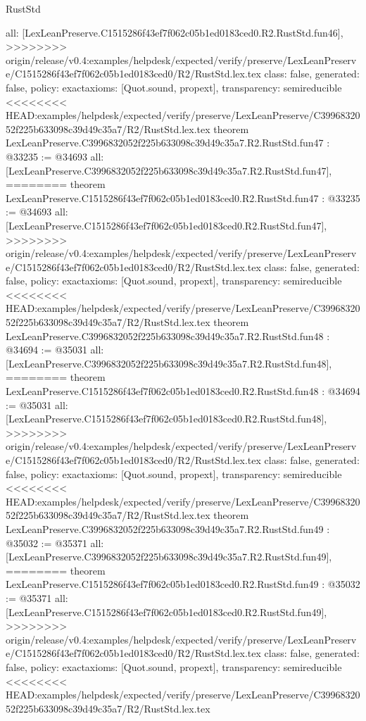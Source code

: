 \begin{lexlean}{RustStd}
\begin{coremodule}
{\begin{coremodule}
{{{{{{{{{{{{{{{{{{{{{{{{{{{{{{{{{{{{{{{{{{{{{{{{{{  all: [LexLeanPreserve.C1515286f43ef7f062c05b1ed0183ced0.R2.RustStd.fun46],
>>>>>>>> origin/release/v0.4:examples/helpdesk/expected/verify/preserve/LexLeanPreserve/C1515286f43ef7f062c05b1ed0183ced0/R2/RustStd.lex.tex
  class: false,
  generated: false,
  policy: exact{axioms: [Quot.sound, propext]},
  transparency: semireducible
}
<<<<<<<< HEAD:examples/helpdesk/expected/verify/preserve/LexLeanPreserve/C3996832052f225b633098c39d49c35a7/R2/RustStd.lex.tex
theorem LexLeanPreserve.C3996832052f225b633098c39d49c35a7.R2.RustStd.fun47 : @33235 := @34693 {
  all: [LexLeanPreserve.C3996832052f225b633098c39d49c35a7.R2.RustStd.fun47],
========
theorem LexLeanPreserve.C1515286f43ef7f062c05b1ed0183ced0.R2.RustStd.fun47 : @33235 := @34693 {
  all: [LexLeanPreserve.C1515286f43ef7f062c05b1ed0183ced0.R2.RustStd.fun47],
>>>>>>>> origin/release/v0.4:examples/helpdesk/expected/verify/preserve/LexLeanPreserve/C1515286f43ef7f062c05b1ed0183ced0/R2/RustStd.lex.tex
  class: false,
  generated: false,
  policy: exact{axioms: [Quot.sound, propext]},
  transparency: semireducible
}
<<<<<<<< HEAD:examples/helpdesk/expected/verify/preserve/LexLeanPreserve/C3996832052f225b633098c39d49c35a7/R2/RustStd.lex.tex
theorem LexLeanPreserve.C3996832052f225b633098c39d49c35a7.R2.RustStd.fun48 : @34694 := @35031 {
  all: [LexLeanPreserve.C3996832052f225b633098c39d49c35a7.R2.RustStd.fun48],
========
theorem LexLeanPreserve.C1515286f43ef7f062c05b1ed0183ced0.R2.RustStd.fun48 : @34694 := @35031 {
  all: [LexLeanPreserve.C1515286f43ef7f062c05b1ed0183ced0.R2.RustStd.fun48],
>>>>>>>> origin/release/v0.4:examples/helpdesk/expected/verify/preserve/LexLeanPreserve/C1515286f43ef7f062c05b1ed0183ced0/R2/RustStd.lex.tex
  class: false,
  generated: false,
  policy: exact{axioms: [Quot.sound, propext]},
  transparency: semireducible
}
<<<<<<<< HEAD:examples/helpdesk/expected/verify/preserve/LexLeanPreserve/C3996832052f225b633098c39d49c35a7/R2/RustStd.lex.tex
theorem LexLeanPreserve.C3996832052f225b633098c39d49c35a7.R2.RustStd.fun49 : @35032 := @35371 {
  all: [LexLeanPreserve.C3996832052f225b633098c39d49c35a7.R2.RustStd.fun49],
========
theorem LexLeanPreserve.C1515286f43ef7f062c05b1ed0183ced0.R2.RustStd.fun49 : @35032 := @35371 {
  all: [LexLeanPreserve.C1515286f43ef7f062c05b1ed0183ced0.R2.RustStd.fun49],
>>>>>>>> origin/release/v0.4:examples/helpdesk/expected/verify/preserve/LexLeanPreserve/C1515286f43ef7f062c05b1ed0183ced0/R2/RustStd.lex.tex
  class: false,
  generated: false,
  policy: exact{axioms: [Quot.sound, propext]},
  transparency: semireducible
}
<<<<<<<< HEAD:examples/helpdesk/expected/verify/preserve/LexLeanPreserve/C3996832052f225b633098c39d49c35a7/R2/RustStd.lex.tex
}}}}}}}}}}}}}}}}}}}}}}}}}}}}}}}}}}}}}}}}}}}}}}}}}}}}
\end{coremodule}}
\end{coremodule}
\end{lexlean}
